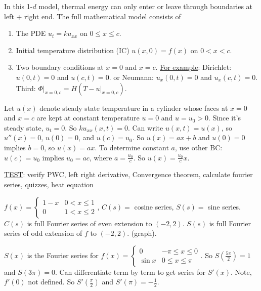 \documentclass[]{article}
\begin{document}
\begin{note}
	In this 1-$d$ model, thermal energy can only enter or leave through boundaries at left + right end.
	The full mathematical model consists of
	\begin{enumerate}
		\item The PDE $u_t = ku_{xx}$ on $0\leq x\leq c$.
		\item Initial temperature distribution (IC) $u(x,0) = f(x)$ on $0<x<c$.
		\item Two boundary conditions at $x=0$ and $x=c$.
		\underline{For example}: Dirichlet: $u(0,t) = 0$ and $u(c,t)=0$.
		or Neumann: $u_x(0,t) = 0$ and $u_x(c,t) = 0$.
		Third: $\Phi \rvert_{x=0,c} = H(T-u\rvert_{x=0,c})$.
	\end{enumerate}
\end{note}

\begin{example}
	Let $u(x) $ denote steady state temperature in a cylinder whose faces at $x=0$ and $x=c$ are kept at constant temperature $u=0$ and $u=u_0>0$.
	Since it's steady state, $u_t = 0$. So $ku_{xx}(x,t) = 0$. Can write $u(x,t) = u(x)$, so $u''(x) = 0$, $u(0) = 0$, and $u(c) = u_0$.
	So $u(x) = ax+b$ and $u(0) = 0$ implies $b=0$, so $u(x) = ax$. To determine constant $a$, use other BC: $u(c) = u_0$ implies $u_0 = ac$, where $a= \frac{u_0}{c}$. So $u(x) = \frac{u_0}{c}x$.
\end{example}

\underline{TEST}: verify PWC, left right derivative, Convergence theorem, calculate fourier series, quizzes, heat equation

\begin{example}
	[Q3.1] $f(x) = \begin{cases} 1-x & 0<x\leq 1 \\ 0 & 1 < x \leq 2 \end{cases}$, $C(s) = $ cosine series, $S(s) = $ sine series. $C(s)$ is full Fourier series of even extension to $(-2,2)$. $S(s)$ is full Fourier series of odd extension of $f$ to $(-2,2)$. (graph).
\end{example}
\begin{example}
	[Q3.2] $S(x)$ is the Fourier series for $f(x) = \begin{cases} 0 & -\pi \leq x \leq 0 \\ \sin{x} & 0\leq x \leq \pi \end{cases}$. So $S\left(\frac{5\pi}{2}\right) = 1$ and $S(3\pi) = 0$. Can differentiate term by term to get series for $S'(x)$. Note, $f'(0)$ not defined. So $S'\left( \frac{\pi}{2} \right)$ and $S'(\pi) = -\frac{1}{2}$.
\end{example}
\end{document}
